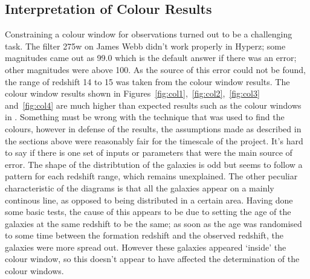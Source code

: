 	\subsection{Interpretation of Colour Results}
	\label{sub:Interp_Colour}
		Constraining a colour window for observations turned out to be a challenging task. The filter 275w on James Webb didn't work properly in Hyperz; some magnitudes came out as 99.0 which is the default answer if there was an error; other magnitudes were above 100. As the source of this error could not be found, the range of redshift 14 to 15 was taken from the colour window results. The colour window results  shown in Figures~\ref{fig:col1},~\ref{fig:col2},~\ref{fig:col3} and~\ref{fig:col4} are much higher than expected results such as the colour windows in \cite{lorenzoni2013constraining}. Something must be wrong with the technique that was used to find the colours, however in defense of the results, the assumptions made as described in the sections above were reasonably fair for the timescale of the project. It's hard to say if there is one set of inputs or parameters that were the main source of error.  The shape of the distribtution of the galaxies is odd but seems to follow a pattern for each redshift range, which remains unexplained. The other peculiar characteristic of the diagrams is that all the galaxies appear on a mainly continous line, as opposed to being distributed in a certain area. Having done some basic tests, the cause of this appears to be due to setting the age of the galaxies at the same redshift to be the same; as soon as the age was randomised to some time between the formation redshift and the observed redshift, the galaxies were more spread out. However these galaxies appeared `inside' the colour window, so this doesn't appear to have affected the determination of the colour windows.
